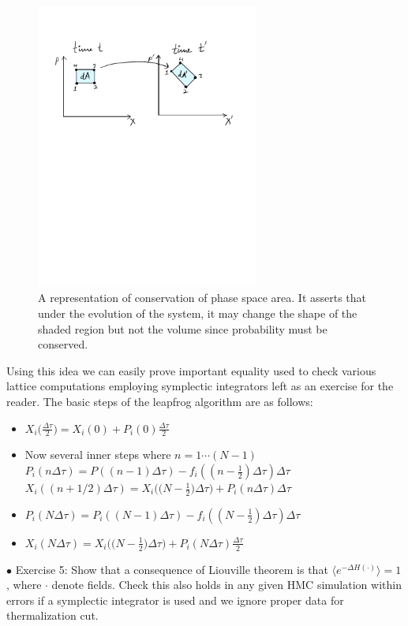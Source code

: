 \documentclass[11pt]{article}
\begin{document}
\begin{figure}[htbp] 
	\centering 
	\includegraphics[width=0.65\textwidth]{figs/PSP.pdf}
	\caption{\label{fig:PSP1}A representation of conservation of phase space area. It asserts that under the evolution of the system, it may change the shape of the shaded region but not the volume since probability must be conserved.}
\end{figure}
Using this idea we can easily prove important equality used to check various lattice computations employing symplectic integrators left as an exercise for the reader. The basic steps of the leapfrog algorithm are as follows:
\begin{itemize}
	\item $X_{i}\big(\frac{\Delta \tau}{2}\big) = X_{i}(0) + P_{i}(0)\frac{\Delta \tau}{2}$
	\item Now several inner steps where $n =  1 \cdots (N-1)$
	\subitem $P_{i}(n \Delta \tau) = P((n-1) \Delta \tau) - f_{i}((n-\frac{1}{2}) \Delta \tau) \Delta \tau$ 
	\subitem $X_{i}((n + 1/2) \Delta \tau) = X_{i}\Big(\Big(N - \frac{1}{2}\Big) \Delta \tau\Big)  + P_{i}(n \Delta \tau) \Delta \tau$
	\item $P_{i}(N \Delta \tau) = P_{i}((N-1) \Delta \tau) - f_{i}((N-\frac{1}{2}) \Delta \tau) \Delta \tau$ 
	\item $X_{i}(N \Delta \tau) = X_{i}\Big(\Big(N - \frac{1}{2}\Big) \Delta \tau\Big) + P_{i}(N \Delta \tau) \frac{\Delta \tau}{2}$ 
\end{itemize} 
    \begin{mdframed}[backgroundcolor=blue!3] 
    \textsc{} 
    $\bullet$ Exercise 5: Show that a consequence of Liouville theorem is that $ \langle e^{-\Delta H(\boldsymbol{\cdot})} \rangle = 1$, where $\boldsymbol{\cdot}$ denote fields. Check this also holds in any given HMC simulation within errors if a symplectic integrator is used and we ignore proper data for thermalization cut.
    \end{mdframed} 
\end{document}

